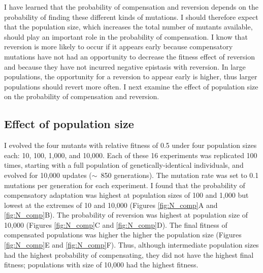 \begin{doublespace}
I have learned that the probability of compensation and reversion
depends on the probability of finding these different kinds of mutations.
%
I should therefore expect that the population size,
which increases the total number of mutants available,
should play an important role in the probability of compensation.
%
I know that reversion is more likely to occur if it appears early
because compensatory mutations have not had an opportunity
to decrease the fitness effect of reversion
and because they have not incurred negative epistasis with reversion.
%
In large populations, the opportunity for a reversion to appear early
is higher, thus larger populations should revert more often.
%
I next examine the effect of population size on the probability
of compensation and reversion.



\subsection{Effect of population size}

I evolved the four mutants with relative fitness of 0.5
under four population sizes each: 10, 100, 1,000, and 10,000.
%
Each of these 16 experiments was replicated 100 times,
starting with a full population of genetically-identical individuals,
and evolved for 10,000 updates ($\sim$~850 generations).
%
The mutation rate was set to 0.1 mutations per generation for each experiment.
%
I found that the probability of compensatory adaptation
was highest at population sizes of 100 and 1,000
but lowest at the extremes of 10 and 10,000
(Figures \ref{fig:N_comp}A and \ref{fig:N_comp}B).
%
The probability of reversion was highest at population size of 10,000
(Figures \ref{fig:N_comp}C and \ref{fig:N_comp}D).
%
The final fitness of compensated populations
was higher the higher the population size
(Figures \ref{fig:N_comp}E and \ref{fig:N_comp}F).
%
Thus, although intermediate population sizes
had the highest probability of compensating,
they did not have the highest final fitness;
populations with size of 10,000 had the highest fitness.




\end{doublespace}
